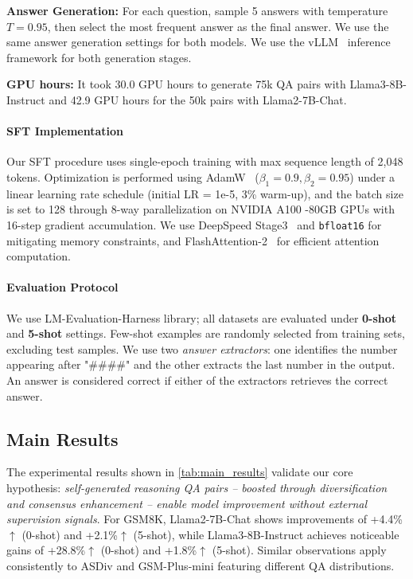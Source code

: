 \textbf{Answer Generation:} For each question, sample 5 answers with temperature $T=0.95$, then select the most frequent answer as the final answer. We use the same answer generation settings for both models. We use the vLLM~\citep{kwon2023efficient} inference framework for both generation stages.

\textbf{GPU hours:}
It took 30.0 GPU hours to generate 75k QA pairs with Llama3-8B-Instruct and 42.9 GPU hours for the 50k pairs with Llama2-7B-Chat.

\paragraph{SFT Implementation}  
Our SFT procedure uses single-epoch training with max sequence length of %
2,048 tokens. Optimization is performed using AdamW~\citep{DBLP:conf/iclr/LoshchilovH19} ($\beta_1=0.9, \beta_2=0.95$) under a linear learning rate schedule (initial LR = 1e-5, 3\% warm-up), and the batch size is set to 128 through 8-way parallelization on NVIDIA A100%
-80GB GPUs with 16-step gradient accumulation. We use DeepSpeed Stage3~\citep{DBLP:conf/kdd/RasleyRRH20}
and \texttt{bfloat16} %
for mitigating memory constraints, and FlashAttention-2~\citep{dao2023flashattention2} for efficient attention computation. 

\paragraph{Evaluation Protocol}  
We use LM-Evaluation-Harness \citep{eval-harness} library; all datasets are evaluated under \textbf{0-shot} and \textbf{5-shot} settings. Few-shot examples are randomly selected from training sets, excluding test samples. We use two \emph{answer extractors}: one identifies the number appearing after "\#\#\#\#" and the other extracts the last number in the output. An answer is considered correct if either of the extractors retrieves the correct answer.

\subsection{Main Results}\label{sec:main_results}

The experimental results shown in \cref{tab:main_results} validate our core hypothesis: \emph{self-generated reasoning QA pairs -- boosted through diversification and consensus enhancement -- enable model improvement without external supervision signals}. 
For GSM8K, Llama2-7B-Chat shows improvements of +4.4\%$\uparrow$ (0-shot) and +2.1\%$\uparrow$ (5-shot), while Llama3-8B-Instruct achieves noticeable gains of +28.8\%$\uparrow$ (0-shot) and +1.8\%$\uparrow$ (5-shot). Similar observations apply consistently to ASDiv 
and GSM-Plus-mini featuring different QA distributions.

